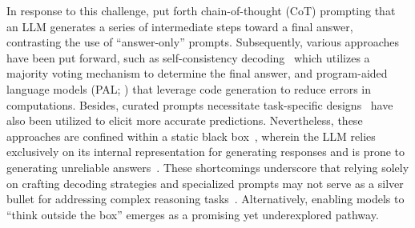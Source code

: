 In response to this challenge,
\citet{wei2022chain} put forth chain-of-thought (CoT) prompting that an LLM generates a series of intermediate steps toward a final answer,
contrasting the use of ``answer-only'' prompts.
Subsequently, 
various approaches have been put forward,
such as self-consistency decoding~\citep{wang2023sc} which utilizes a majority voting mechanism to determine the final answer,
and program-aided language models (PAL; \citealp{gao2022pal,chen2022program}) 
that leverage code generation to reduce errors in computations.
Besides,
curated prompts necessitate task-specific designs~\citep{zheng2023php} have also been utilized to elicit more accurate predictions.
Nevertheless, 
these approaches are confined within a static black box~\citep{yao2023react}, 
wherein the LLM relies exclusively on its internal representation for generating responses and is prone to generating unreliable answers~\citep{ji2023hallu, yin2023selfaware}.
These shortcomings underscore that relying solely on crafting decoding strategies and specialized prompts may not serve as a silver bullet for addressing complex reasoning tasks~\citep{qiao2023reasoning}.
Alternatively, 
enabling models to ``think outside the box'' emerges as a promising yet underexplored pathway.



